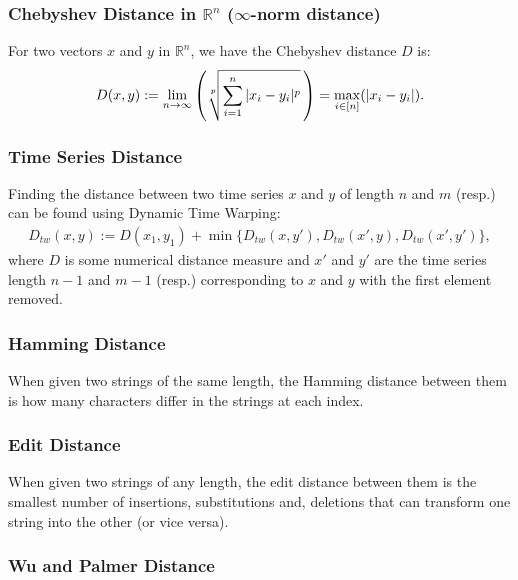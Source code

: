 \subsubsection{Chebyshev Distance in $\mathbb{R}^n$ ($\infty$-norm distance)}

For two vectors $x$ and $y$ in $\mathbb{R}^n$, we have the Chebyshev
distance $D$ is: \begin{gather*}
    D(x, y) := \lim_{n \to \infty} \left(
        \sqrt[\uproot{2}p]{\sum_{i = 1}^n |x_i - y_i|^p}
    \, \right) = \max_{i \in [n]}(|x_i - y_i|).
\end{gather*}

\subsubsection{Time Series Distance}

Finding the distance between two time series $x$ and $y$
of length $n$ and $m$ (resp.) can be found using Dynamic Time 
Warping: \begin{gather*}
    D_{tw}(x, y) := D(x_1, y_1) + 
    \min\{
        D_{tw}(x, y'),
        D_{tw}(x', y),
        D_{tw}(x', y')
    \},
\end{gather*} where $D$ is some numerical distance measure and
$x'$ and $y'$ are the time series length $n - 1$ and $m - 1$
(resp.) corresponding to $x$ and $y$ with the first element
removed.

\subsubsection{Hamming Distance}

When given two strings of the same length, the Hamming distance
between them is how many characters differ in the strings at each
index.

\subsubsection{Edit Distance}

When given two strings of any length, the edit distance between
them is the smallest number of insertions, substitutions and,
deletions that can transform one string into the other (or vice versa).

\subsubsection{Wu and Palmer Distance}

